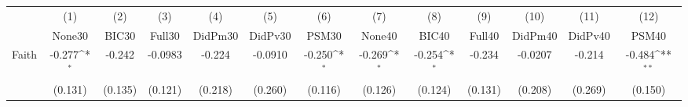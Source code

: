 {
\def\sym#1{\ifmmode^{#1}\else\(^{#1}\)\fi}
\begin{tabular}{l*{12}{c}}
\toprule
            &\multicolumn{1}{c}{(1)}&\multicolumn{1}{c}{(2)}&\multicolumn{1}{c}{(3)}&\multicolumn{1}{c}{(4)}&\multicolumn{1}{c}{(5)}&\multicolumn{1}{c}{(6)}&\multicolumn{1}{c}{(7)}&\multicolumn{1}{c}{(8)}&\multicolumn{1}{c}{(9)}&\multicolumn{1}{c}{(10)}&\multicolumn{1}{c}{(11)}&\multicolumn{1}{c}{(12)}\\
            &\multicolumn{1}{c}{None30}&\multicolumn{1}{c}{BIC30}&\multicolumn{1}{c}{Full30}&\multicolumn{1}{c}{DidPm30}&\multicolumn{1}{c}{DidPv30}&\multicolumn{1}{c}{PSM30}&\multicolumn{1}{c}{None40}&\multicolumn{1}{c}{BIC40}&\multicolumn{1}{c}{Full40}&\multicolumn{1}{c}{DidPm40}&\multicolumn{1}{c}{DidPv40}&\multicolumn{1}{c}{PSM40}\\
\midrule
Faith       &      -0.277\sym{*}  &      -0.242         &     -0.0983         &      -0.224         &     -0.0910         &      -0.250\sym{*}  &      -0.269\sym{*}  &      -0.254\sym{*}  &      -0.234         &     -0.0207         &      -0.214         &      -0.484\sym{**} \\
            &     (0.131)         &     (0.135)         &     (0.121)         &     (0.218)         &     (0.260)         &     (0.116)         &     (0.126)         &     (0.124)         &     (0.131)         &     (0.208)         &     (0.269)         &     (0.150)         \\
\bottomrule
\end{tabular}
}
